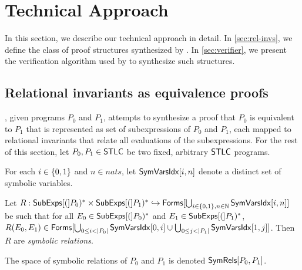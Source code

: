 \section{Technical Approach}
%
In this section, we describe our technical approach in detail.
%
In \autoref{sec:rel-invs}, we define the class of proof
structures synthesized by \sys.
%
In \autoref{sec:verifier}, we present the verification algorithm used
by \sys to synthesize such structures.

\subsection{Relational invariants as equivalence proofs}
\label{sec:rel-invs}
%
\sys, given programs $P_0$ and $P_1$, attempts to synthesize a proof
that $P_0$ is equivalent to $P_1$ that is represented as set of
subexpressions of $P_0$ and $P_1$, each mapped to relational
invariants that relate all evaluations of the subexpressions.
%
For the rest of this section, let $P_0, P_1 \in \mathsf{STLC}$ be two fixed,
arbitrary $\mathsf{STLC}$ programs.

For each $i \in \{ 0, 1 \}$ and $n \in nats$, let $\mathsf{SymVarsIdx}[ i, n ]$
denote a distinct set of symbolic variables.
%
\begin{defn}
  \label{defn:sym-rels}
  Let $R: \mathsf{SubExps}[ ( ]P_0)^{*} \times \mathsf{SubExps}[ ( ]P_1)^{*} \hookrightarrow
  \mathsf{Forms}[  \bigcup_{i \in \{ 0 , 1 \}, n \in \mathbb{N} }
    \mathsf{SymVarsIdx}[ i, n ]  ]$ be such that %
  for all $E_0 \in \mathsf{SubExps}[ ( ]P_0)^{*}$ and $E_1 \in \mathsf{SubExps}[ ( ]P_1)^{*}$,
  $R(E_0, E_1) \in \formulas{ %
    \bigunion_{ 0 \leq i < |P_0|} \symvarsidx{0}{i} \union %
    \bigunion_{0 \leq j < |P_1|} \symvarsidx{1}{j} }$.
  Then $R$ are \emph{symbolic relations}.
\end{defn}
%
The space of symbolic relations of $P_0$ and $P_1$ is denoted
$\mathsf{SymRels}[ P_0, P_1 ]$.

